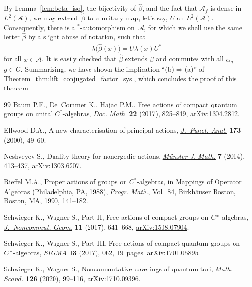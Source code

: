 \documentclass[11pt]{article}
\numberwithin{equation}{section}
\numberwithin{equation}{section}
\newcommand*{\Star}{$^*$\nobreakdash}
\newcommand*{\alg}{\mathcal}		%
\newcommand*{\aA}{\alg{A}}			%
\begin{document}
By Lemma~\ref{lem:beta_iso}, the bijectivity of $\hat \beta$, and the fact that $\aA_f$ is dense in $L^2(\aA)$, we may extend~$\hat \beta$ to a unitary map, let's say, $U$ on $L^2(\aA)$.
Consequently, there is a \Star-automorphism on~$\aA$, for which we shall use the same letter $\hat \beta$ by a slight abuse of notation, such that
\begin{align*}
	\lambda\big( \hat \beta(x) \big) = U \lambda(x) U^*
\end{align*}
for all $x \in \aA$.
It is easily checked that $\hat \beta$ extends $\beta$ and commutes with all $\alpha_g$, $g\in G$.
Summarizing, we have shown the implication ``(b)$\Rightarrow$(a)'' of Theorem~\ref{thm:lift_conjugated_factor_sys}, which concludes the proof of this theorem.
\begin{thebibliography}{99}
Baum P.F., De~Commer K., Hajac P.M., Free actions of compact quantum groups on
 unital {$C^*$}-algebras, \href{https://doi.org/10.25537/dm.2017v22.825-849}{\textit{Doc. Math.}} \textbf{22} (2017), 825--849,
 \href{https://arxiv.org/abs/1304.2812}{arXiv:1304.2812}.

Ellwood D.A., A new characterisation of principal actions, \href{https://doi.org/10.1006/jfan.2000.3561}{\textit{J.~Funct.
 Anal.}} \textbf{173} (2000), 49--60.

Neshveyev S., Duality theory for nonergodic actions, \href{https://doi.org/10.17879/58269764511}{\textit{M\"unster J.
 Math.}} \textbf{7} (2014), 413--437, \href{https://arxiv.org/abs/1303.6207}{arXiv:1303.6207}.

Rieffel M.A., Proper actions of groups on {$C^*$}-algebras, in Mappings of
 Operator Algebras ({P}hiladelphia, {PA}, 1988), \textit{Progr. Math.},
 Vol.~84, \href{https://doi.org/10.1007/978-1-4612-0453-4_6}{Birkh\"auser Boston}, Boston, MA, 1990, 141--182.

Schwieger K., Wagner S., Part {II}, {F}ree actions of compact groups on {$\rm
 C^*$}-algebras, \href{https://doi.org/10.4171/JNCG/11-2-6}{\textit{J.~Noncommut. Geom.}} \textbf{11} (2017), 641--668,
 \href{https://arxiv.org/abs/#2}{arXiv:1508.07904}.

Schwieger K., Wagner S., Part {III}, {F}ree actions of compact quantum groups
 on {${\rm C}^*$}-algebras, \href{https://doi.org/10.3842/SIGMA.2017.062}{\textit{SIGMA}} \textbf{13} (2017), 062, 19~pages,
 \href{https://arxiv.org/abs/1701.05895}{arXiv:1701.05895}.

Schwieger K., Wagner S., Noncommutative coverings of quantum tori,
 \href{https://doi.org/10.7146/math.scand.a-116147}{\textit{Math. Scand.}} \textbf{126} (2020), 99--116, \href{https://arxiv.org/abs/1710.09396}{arXiv:1710.09396}.

\end{thebibliography}
\end{document}
